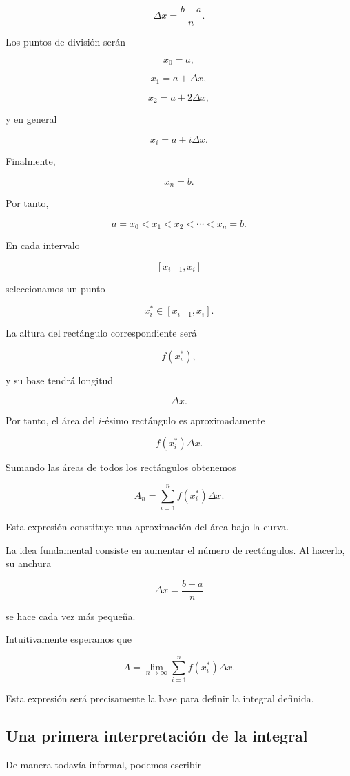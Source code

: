 \documentclass[12pt]{article}
\begin{document}
\[
\Delta x=\frac{b-a}{n}.
\]

Los puntos de división serán

\[
x_0=a,
\]

\[
x_1=a+\Delta x,
\]

\[
x_2=a+2\Delta x,
\]

y en general

\[
x_i=a+i\Delta x.
\]

Finalmente,

\[
x_n=b.
\]

Por tanto,

\[
a=x_0<x_1<x_2<\cdots<x_n=b.
\]

En cada intervalo

\[
[x_{i-1},x_i]
\]

seleccionamos un punto

\[
x_i^*\in[x_{i-1},x_i].
\]

La altura del rectángulo correspondiente será

\[
f(x_i^*),
\]

y su base tendrá longitud

\[
\Delta x.
\]

Por tanto, el área del $i$-ésimo rectángulo es aproximadamente

\[
f(x_i^*)\Delta x.
\]

Sumando las áreas de todos los rectángulos obtenemos

\[
A_n
=
\sum_{i=1}^{n}
f(x_i^*)\Delta x.
\]

Esta expresión constituye una aproximación del área bajo la curva.

La idea fundamental consiste en aumentar el número de rectángulos.
Al hacerlo, su anchura

\[
\Delta x=\frac{b-a}{n}
\]

se hace cada vez más pequeña.

Intuitivamente esperamos que

\[
A
=
\lim_{n\to\infty}
\sum_{i=1}^{n}
f(x_i^*)\Delta x.
\]

Esta expresión será precisamente la base para definir la integral
definida.

\subsection{Una primera interpretación de la integral}

De manera todavía informal, podemos escribir
\end{document}
